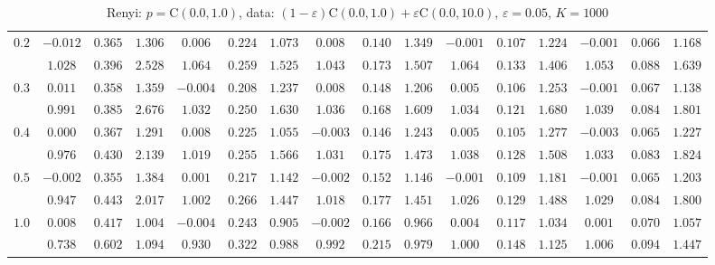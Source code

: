 \documentclass[11pt]{article}
\begin{document}
\begin{table}[ht]
\begin{center}
\begin{tabular}{|c|ccc|ccc|ccc|ccc|ccc|}
\hline 
$0.2$ & $ -0.012 $ & $ 0.365 $ & $ 1.306 $ & $ 0.006 $ & $ 0.224 $ & $ 1.073 $ & $ 0.008 $ & $ 0.140 $ & $ 1.349 $ & $ -0.001 $ & $ 0.107 $ & $ 1.224 $ & $ -0.001 $ & $ 0.066 $ & $ 1.168 $\\ 
 & $ 1.028 $ & $ 0.396 $ & $ 2.528 $ & $ 1.064 $ & $ 0.259 $ & $ 1.525 $ & $ 1.043 $ & $ 0.173 $ & $ 1.507 $ & $ 1.064 $ & $ 0.133 $ & $ 1.406 $ & $ 1.053 $ & $ 0.088 $ & $ 1.639 $\\ 
\hline 
$0.3$ & $ 0.011 $ & $ 0.358 $ & $ 1.359 $ & $ -0.004 $ & $ 0.208 $ & $ 1.237 $ & $ 0.008 $ & $ 0.148 $ & $ 1.206 $ & $ 0.005 $ & $ 0.106 $ & $ 1.253 $ & $ -0.001 $ & $ 0.067 $ & $ 1.138 $\\ 
 & $ 0.991 $ & $ 0.385 $ & $ 2.676 $ & $ 1.032 $ & $ 0.250 $ & $ 1.630 $ & $ 1.036 $ & $ 0.168 $ & $ 1.609 $ & $ 1.034 $ & $ 0.121 $ & $ 1.680 $ & $ 1.039 $ & $ 0.084 $ & $ 1.801 $\\ 
\hline 
$0.4$ & $ 0.000 $ & $ 0.367 $ & $ 1.291 $ & $ 0.008 $ & $ 0.225 $ & $ 1.055 $ & $ -0.003 $ & $ 0.146 $ & $ 1.243 $ & $ 0.005 $ & $ 0.105 $ & $ 1.277 $ & $ -0.003 $ & $ 0.065 $ & $ 1.227 $\\ 
 & $ 0.976 $ & $ 0.430 $ & $ 2.139 $ & $ 1.019 $ & $ 0.255 $ & $ 1.566 $ & $ 1.031 $ & $ 0.175 $ & $ 1.473 $ & $ 1.038 $ & $ 0.128 $ & $ 1.508 $ & $ 1.033 $ & $ 0.083 $ & $ 1.824 $\\ 
\hline 
$0.5$ & $ -0.002 $ & $ 0.355 $ & $ 1.384 $ & $ 0.001 $ & $ 0.217 $ & $ 1.142 $ & $ -0.002 $ & $ 0.152 $ & $ 1.146 $ & $ -0.001 $ & $ 0.109 $ & $ 1.181 $ & $ -0.001 $ & $ 0.065 $ & $ 1.203 $\\ 
 & $ 0.947 $ & $ 0.443 $ & $ 2.017 $ & $ 1.002 $ & $ 0.266 $ & $ 1.447 $ & $ 1.018 $ & $ 0.177 $ & $ 1.451 $ & $ 1.026 $ & $ 0.129 $ & $ 1.488 $ & $ 1.029 $ & $ 0.084 $ & $ 1.800 $\\ 
\hline 
$1.0$ & $ 0.008 $ & $ 0.417 $ & $ 1.004 $ & $ -0.004 $ & $ 0.243 $ & $ 0.905 $ & $ -0.002 $ & $ 0.166 $ & $ 0.966 $ & $ 0.004 $ & $ 0.117 $ & $ 1.034 $ & $ 0.001 $ & $ 0.070 $ & $ 1.057 $\\ 
 & $ 0.738 $ & $ 0.602 $ & $ 1.094 $ & $ 0.930 $ & $ 0.322 $ & $ 0.988 $ & $ 0.992 $ & $ 0.215 $ & $ 0.979 $ & $ 1.000 $ & $ 0.148 $ & $ 1.125 $ & $ 1.006 $ & $ 0.094 $ & $ 1.447 $\\ 
\hline 
\end{tabular}
\caption{Renyi: $p = \mathrm{C}(0.0,1.0)$, data: $(1-\varepsilon)\mathrm{C}(0.0,1.0) + \varepsilon \mathrm{C}(0.0,10.0)$, $\varepsilon =  0.05$, $K = 1000$} 
\end{center}
\end{table}
\end{document}
